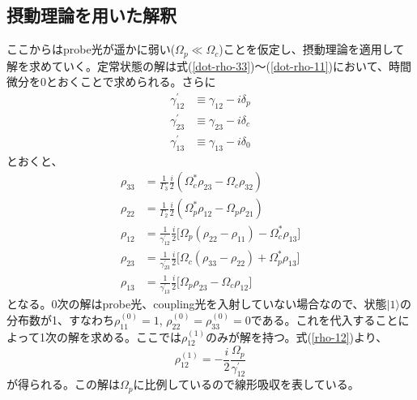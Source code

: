 \documentclass[dvipdfmx]{jsreport}
\begin{document}
\subsection{摂動理論を用いた解釈}
ここからはprobe光が遥かに弱い($\Omega_p \ll \Omega_c$)ことを仮定し、摂動理論を適用して解を求めていく。定常状態の解は式(\ref{dot-rho-33})〜(\ref{dot-rho-11})において、時間微分を0とおくことで求められる。さらに
\begin{equation}
\begin{split}
    {\gamma_{12}^{'}} &\equiv \gamma_{12} - i\delta_p \\
    {\gamma_{23}^{'}} &\equiv \gamma_{23} - i\delta_c \\
    {\gamma_{13}^{'}} &\equiv \gamma_{13} - i\delta_0
\end{split}
\end{equation}
とおくと、
\begin{align}
\rho_{33} &= \frac{1}{\Gamma_3} \frac{i}{2} \left( \Omega_c^* {\rho_{23}} - \Omega_c{\rho_{32}} \right) \\
\label{rho-22}
\rho_{22} &= \frac{1}{\Gamma_2} \frac{i}{2} \left( \Omega_p^* {\rho_{12}} - \Omega_p{\rho_{21}} \right) \\
\label{rho-12}
\rho_{12} &= \frac{1}{\gamma_{12}^{'}} \frac{i}{2} \lbrack \Omega_p (\rho_{22} - \rho_{11}) - \Omega_c^* \rho_{13} \rbrack \\
\label{rho-23}
\rho_{23} &= \frac{1}{\gamma_{23}^{'}} \frac{i}{2} \lbrack \Omega_c (\rho_{33} - \rho_{22}) + \Omega_p^* \rho_{13} \rbrack \\
\rho_{13} &= \frac{1}{\gamma_{13}^{'}} \frac{i}{2} \lbrack \Omega_p \rho_{23} - \Omega_c \rho_{12} \rbrack
\end{align}
となる。0次の解はprobe光、coupling光を入射していない場合なので、状態$| 1 \rangle$の分布数が1、すなわち$\rho_{11}^{(0)} = 1$, $\rho_{22}^{(0)} = \rho_{33}^{(0)} = 0$である。これを代入することによって1次の解を求める。ここでは$\rho_{12}^{(1)}$のみが解を持つ。式(\ref{rho-12})より、
\begin{equation}
\label{rho-12-1}
    \rho_{12}^{(1)} = - \frac{i}{2} \frac{\Omega_p}{\gamma_{12}^{'}}
\end{equation}
が得られる。この解は$\Omega_p$に比例しているので線形吸収を表している。
\end{document}
